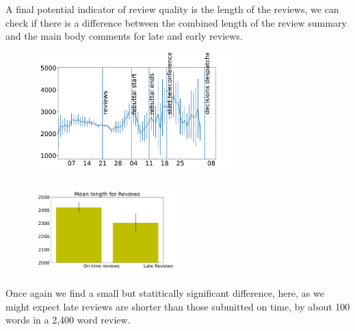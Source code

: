 A final potential indicator of review quality is the length of the
reviews, we can check if there is a difference between the combined
length of the review summary and the main body comments for late and
early reviews.

\begin{figure}[htb]
\includegraphics[width=0.70\textwidth]{diagrams/neurips/review-length-time.pdf}


\caption{}
\label{review-length-time}
\end{figure}

\begin{figure}[htb]
\includegraphics[width=0.50\textwidth]{diagrams/neurips/review-length-early-late.pdf}


\caption{}
\label{review-length-early-late}
\end{figure}

Once again we find a small but statitically significant difference,
here, as we might expect late reviews are shorter than those submitted
on time, by about 100 words in a 2,400 word review.

\begin{Shaded}
\begin{Highlighting}[]
\OperatorTok{=}\OperatorTok{=}\OperatorTok{=}
\OperatorTok{=}\OperatorTok{=}\NormalTok{)}
\OperatorTok{=}\OperatorTok{=}\NormalTok{)}\OperatorTok{/}\OperatorTok{=}\NormalTok{) }
\end{Highlighting}
\end{Shaded}

